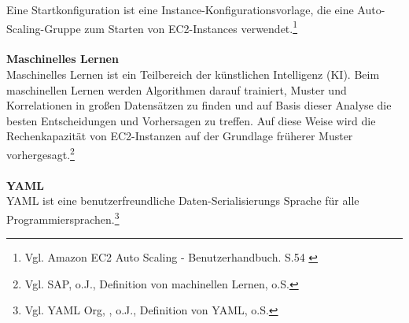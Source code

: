 Eine Startkonfiguration ist eine Instance-Konfigurationsvorlage, die eine Auto-Scaling-Gruppe zum Starten von EC2-Instances verwendet.\footnote{Vgl. Amazon EC2 Auto Scaling - Benutzerhandbuch. S.54 \cite{AMZ31}}
\\\\
\textbf{Maschinelles Lernen}\\
Maschinelles Lernen ist ein Teilbereich der künstlichen Intelligenz (KI). Beim maschinellen Lernen werden Algorithmen darauf trainiert, Muster und Korrelationen in großen Datensätzen zu finden und auf Basis dieser Analyse die besten Entscheidungen und Vorhersagen zu treffen. Auf diese Weise wird die Rechenkapazität von EC2-Instanzen auf der Grundlage früherer Muster vorhergesagt.\footnote{Vgl. SAP, o.J., Definition von machinellen Lernen, o.S.\cite{ML1}}
\\\\
\textbf{YAML}\\
YAML ist eine benutzerfreundliche Daten-Serialisierungs  Sprache für alle Programmiersprachen.\footnote{Vgl. YAML Org, , o.J., Definition von YAML, o.S.\cite{YAML}}
